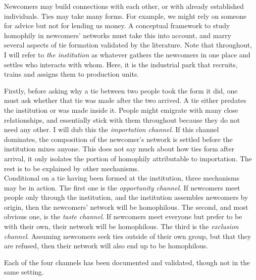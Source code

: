 \noindent Newcomers may build connections with each other, or with already established individuals. Ties may take many forms. For example, we might rely on someone for advice but not for lending us money. A conceptual framework to study homophily in newcomers' networks must take this into account, and marry several aspects of tie formation validated by the literature. Note that throughout, I will refer to \textit{the institution} as whatever gathers the newcomers in one place and settles who interacts with whom. Here, it is the industrial park that recruits, trains and assigns them to production units.  \\


\noindent Firstly, before asking why a tie between two people took the form it did, one must ask whether that tie was made after the two arrived. A tie either predates the institution or was made inside it. People might emigrate with many close relationships, and essentially stick with them throughout because they do not need any other. I will dub this the \textit{importation channel}. If this channel dominates, the composition of the newcomer's network is settled before the institution mixes anyone. This does not say much about how ties form after arrival, it only isolates the portion of homophily attributable to importation. The rest is to be explained by other mechanisms. \\

\noindent Conditional on a tie having been formed at the institution, three mechanisms may be in action. The first one is the \textit{opportunity channel}. If newcomers meet people only through the institution, and the institution assembles newcomers by origin, then the newcomers' network will be homophilous. The second, and most obvious one, is the \textit{taste channel}. If newcomers meet everyone but prefer to be with their own, their network will  be homophilous. The third is the \textit{exclusion channel}. Assuming newcomers seek ties outside of their own group, but that they are refused, then their network will also end up to be homophilous. \\


\noindent Each of the four channels has been documented and validated, though not in the same setting. \\

